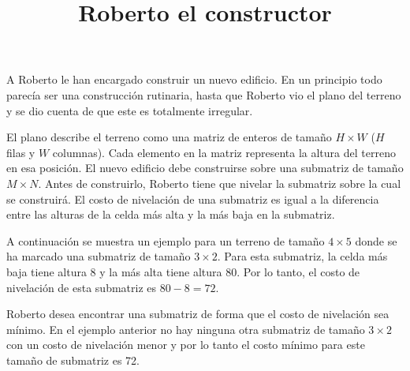 \documentclass{oci}
\title{Roberto el constructor}
\begin{document}
\begin{problemDescription}
  A Roberto le han encargado construir un nuevo edificio.
  En un principio todo parecía ser una construcción rutinaria, hasta que Roberto vio el plano
  del terreno y se dio cuenta de que este es totalmente irregular.

  El plano describe el terreno como una matriz de enteros de tamaño $H\times W$
  ($H$ filas y $W$ columnas).
  Cada elemento en la matriz representa la altura del terreno en esa posición.
  El nuevo edificio debe construirse sobre una submatriz de tamaño $M\times N$.
  Antes de construirlo, Roberto tiene que nivelar la submatriz sobre la cual se construirá.
  El costo de nivelación de una submatriz es igual a la diferencia entre las alturas de la celda
  más alta y la más baja en la submatriz.

  A continuación se muestra un ejemplo para un terreno de tamaño $4\times 5$ donde se ha marcado
  una submatriz de tamaño $3\times 2$.
  Para esta submatriz, la celda más baja tiene altura 8 y la más alta tiene altura 80.
  Por lo tanto, el costo de nivelación de esta submatriz es $80 - 8=72$.

  \begin{center}
  \end{center}

  Roberto desea encontrar una submatriz de forma que el costo de nivelación sea mínimo.
  En el ejemplo anterior no hay ninguna otra submatriz de tamaño $3\times 2$ con un costo de
  nivelación menor y por lo tanto el costo mínimo para este tamaño de submatriz es 72.
\end{problemDescription}
\end{document}
